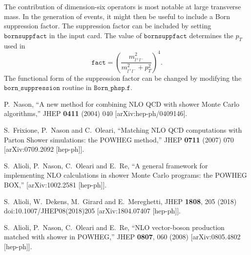 \documentclass[paper]{JHEP3}
\begin{document}
The contribution of dimension-six operators is most notable at large transverse mass. In the generation of events, it might then be useful to include a 
Born suppression factor. The suppression factor can be included by setting   $\texttt{bornsuppfact}$ in the input card. 
The value of  $\texttt{bornsuppfact}$ determines the $p_T$ used in 
\begin{equation}
\texttt{fact} = \left(\frac{m^2_{l^+ l^-}}{m^2_{l^+ l^-} + p_T^2}\right)^4.
\end{equation}
The functional form of the suppression factor can be changed by modifying the $\texttt{born\_suppression}$ routine in $\texttt{Born\_phsp.f}$.


\begin{thebibliography}{10}

  P.~Nason,
  ``A new method for combining NLO QCD with shower Monte Carlo algorithms,''
  JHEP {\bf 0411} (2004) 040
  [arXiv:hep-ph/0409146].

  S.~Frixione, P.~Nason and C.~Oleari,
``Matching NLO QCD computations with Parton Shower simulations: the POWHEG
method,''
  JHEP {\bf 0711} (2007) 070
  [arXiv:0709.2092 [hep-ph]].

  S.~Alioli, P.~Nason, C.~Oleari and E.~Re,
``A general framework for implementing NLO calculations in shower Monte Carlo
  programs: the POWHEG BOX,''
  [arXiv:1002.2581 [hep-ph]].

  
  S.~Alioli, W.~Dekens, M.~Girard and E.~Mereghetti,
  JHEP {\bf 1808}, 205 (2018)
  doi:10.1007/JHEP08(2018)205
  [arXiv:1804.07407 [hep-ph]].

 S.~Alioli, P.~Nason, C.~Oleari and E.~Re,
  ``NLO vector-boson production matched with shower in POWHEG,''
  JHEP {\bf 0807}, 060 (2008)
  [arXiv:0805.4802 [hep-ph]].



\end{thebibliography}
\end{document}
